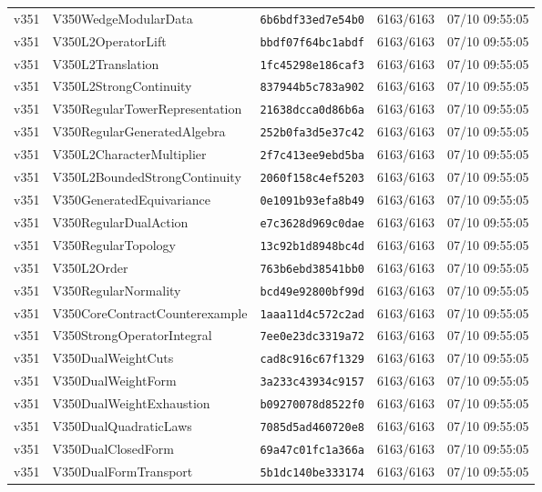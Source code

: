 \documentclass[11pt]{article}
\theoremstyle{definition}\newtheorem{deriv}{Derivação}
\begin{document}
{\begin{longtable}{@{}lllll@{}}
v351 & V350WedgeModularData & \texttt{6b6bdf33ed7e54b0} & 6163/6163 & 07/10 09:55:05 \\
v351 & V350L2OperatorLift & \texttt{bbdf07f64bc1abdf} & 6163/6163 & 07/10 09:55:05 \\
v351 & V350L2Translation & \texttt{1fc45298e186caf3} & 6163/6163 & 07/10 09:55:05 \\
v351 & V350L2StrongContinuity & \texttt{837944b5c783a902} & 6163/6163 & 07/10 09:55:05 \\
v351 & V350RegularTowerRepresentation & \texttt{21638dcca0d86b6a} & 6163/6163 & 07/10 09:55:05 \\
v351 & V350RegularGeneratedAlgebra & \texttt{252b0fa3d5e37c42} & 6163/6163 & 07/10 09:55:05 \\
v351 & V350L2CharacterMultiplier & \texttt{2f7c413ee9ebd5ba} & 6163/6163 & 07/10 09:55:05 \\
v351 & V350L2BoundedStrongContinuity & \texttt{2060f158c4ef5203} & 6163/6163 & 07/10 09:55:05 \\
v351 & V350GeneratedEquivariance & \texttt{0e1091b93efa8b49} & 6163/6163 & 07/10 09:55:05 \\
v351 & V350RegularDualAction & \texttt{e7c3628d969c0dae} & 6163/6163 & 07/10 09:55:05 \\
v351 & V350RegularTopology & \texttt{13c92b1d8948bc4d} & 6163/6163 & 07/10 09:55:05 \\
v351 & V350L2Order & \texttt{763b6ebd38541bb0} & 6163/6163 & 07/10 09:55:05 \\
v351 & V350RegularNormality & \texttt{bcd49e92800bf99d} & 6163/6163 & 07/10 09:55:05 \\
v351 & V350CoreContractCounterexample & \texttt{1aaa11d4c572c2ad} & 6163/6163 & 07/10 09:55:05 \\
v351 & V350StrongOperatorIntegral & \texttt{7ee0e23dc3319a72} & 6163/6163 & 07/10 09:55:05 \\
v351 & V350DualWeightCuts & \texttt{cad8c916c67f1329} & 6163/6163 & 07/10 09:55:05 \\
v351 & V350DualWeightForm & \texttt{3a233c43934c9157} & 6163/6163 & 07/10 09:55:05 \\
v351 & V350DualWeightExhaustion & \texttt{b09270078d8522f0} & 6163/6163 & 07/10 09:55:05 \\
v351 & V350DualQuadraticLaws & \texttt{7085d5ad460720e8} & 6163/6163 & 07/10 09:55:05 \\
v351 & V350DualClosedForm & \texttt{69a47c01fc1a366a} & 6163/6163 & 07/10 09:55:05 \\
v351 & V350DualFormTransport & \texttt{5b1dc140be333174} & 6163/6163 & 07/10 09:55:05 \\

\end{longtable}}
\end{document}

